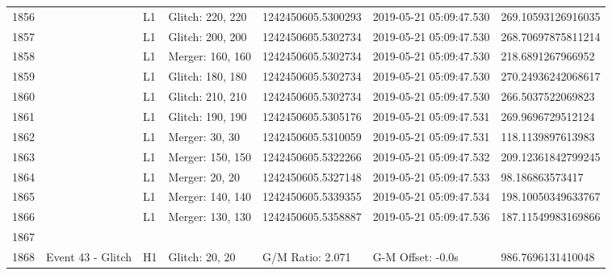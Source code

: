 \begin{longtable}{lllllll}
1856 &                                                    &       L1 &  Glitch: 220, 220 &  1242450605.5300293 &  2019-05-21 05:09:47.530 &  269.10593126916035 \\
1857 &                                                    &       L1 &  Glitch: 200, 200 &  1242450605.5302734 &  2019-05-21 05:09:47.530 &  268.70697875811214 \\
1858 &                                                    &       L1 &  Merger: 160, 160 &  1242450605.5302734 &  2019-05-21 05:09:47.530 &   218.6891267966952 \\
1859 &                                                    &       L1 &  Glitch: 180, 180 &  1242450605.5302734 &  2019-05-21 05:09:47.530 &  270.24936242068617 \\
1860 &                                                    &       L1 &  Glitch: 210, 210 &  1242450605.5302734 &  2019-05-21 05:09:47.530 &   266.5037522069823 \\
1861 &                                                    &       L1 &  Glitch: 190, 190 &  1242450605.5305176 &  2019-05-21 05:09:47.531 &   269.9696729512124 \\
1862 &                                                    &       L1 &    Merger: 30, 30 &  1242450605.5310059 &  2019-05-21 05:09:47.531 &   118.1139897613983 \\
1863 &                                                    &       L1 &  Merger: 150, 150 &  1242450605.5322266 &  2019-05-21 05:09:47.532 &  209.12361842799245 \\
1864 &                                                    &       L1 &    Merger: 20, 20 &  1242450605.5327148 &  2019-05-21 05:09:47.533 &     98.186863573417 \\
1865 &                                                    &       L1 &  Merger: 140, 140 &  1242450605.5339355 &  2019-05-21 05:09:47.534 &  198.10050349633767 \\
1866 &                                                    &       L1 &  Merger: 130, 130 &  1242450605.5358887 &  2019-05-21 05:09:47.536 &  187.11549983169866 \\
1867 &                                                    &          &                   &                     &                          &                     \\
1868 &                                  Event 43 - Glitch &       H1 &    Glitch: 20, 20 &    G/M Ratio: 2.071 &        G-M Offset: -0.0s &   986.7696131410048 \\

\end{longtable}
